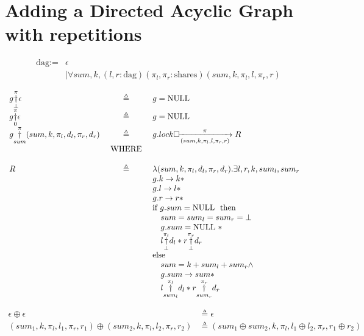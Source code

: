 \documentclass[8pt]{article}
\newcommand{\lock}[2]{ \square \hspace{-1ex} \xrightarrow[#1]{#2}}
\newcommand{\NULL}{\text{NULL }}
\newcommand{\dagt}{\text{dag}{}}
\newcommand{\DAG}[2]{ \underset{#2}{\overset{#1}{\dag}} }
\begin{document}




\newpage
\section{Adding a Directed Acyclic Graph with repetitions}
\begin{align*}
\dagt :=& \epsilon \\
	  &|\forall sum, k, (l, r : \dagt)(\pi_l, \pi_r: \text{shares}) (sum,k, \pi_l, l, \pi_r, r)  
\end{align*}

$$
\begin{array}{lcll}
g \DAG{\pi}{\bot} \epsilon &\triangleq&  g =\NULL &\\
g \DAG{\pi}{0} \epsilon &\triangleq&  g =\NULL &\\
g \DAG{\pi}{sum} (sum,k, \pi_l, d_l, \pi_r, d_r)  &\triangleq& g.lock \lock{(sum,k, \pi_l, l, \pi_r, r)}{\pi} R& \\
&\text{ WHERE }&& \\
\\
R &\triangleq& \lambda (sum,k, \pi_l, d_l, \pi_r, d_r).  \exists l, r, k, sum_l, sum_r\\ 
			 & & g.k \rightarrow k \ast \\
			 &  & g.l \rightarrow l  \ast \\
			&  & g.r \rightarrow r  \ast \\
			 & & \text{if } g.sum = \NULL \text{ then }\\
			 & & \ \ \ sum = sum_l = sum_r = \bot\\
			 & & \ \ \  g.sum = \NULL \ast \\ 
			 &  & \ \ \ l \DAG{\pi_l}{\bot} d_l \ast
			             r \DAG{\pi_r}{\bot} d_r  \\
			 & & \text{else}\\
			 & & \ \ \ sum = k + sum_l + sum_r \wedge \\
			 & & \ \ \  g.sum \rightarrow sum \ast \\ 
			 &  & \ \ \ l \DAG{\pi_l}{sum_l} d_l \ast  
			            r \DAG{\pi_r}{sum_r} d_r 
\end{array}
$$

\begin{align*}
\epsilon \oplus \epsilon & \triangleq \epsilon \\
(sum_1,k, \pi_{l}, l_1, \pi_{r}, r_1)   \oplus (sum_2,k, \pi_{l}, l_2, \pi_{r}, r_2)   & \triangleq  (sum_1\oplus sum_2 ,k, \pi_{l}, l_1 \oplus l_2, \pi_{r}, r_1 \oplus r_2)   \\
\end{align*}
\end{document}
